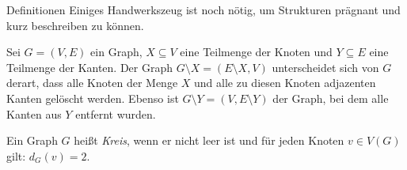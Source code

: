 \begin{chapter}{Definitionen}
  Einiges Handwerkszeug ist noch nötig, um Strukturen prägnant und kurz beschreiben zu können.
  
  \begin{definition}
   Sei $G=(V,E)$ ein Graph, $X \subseteq V$ eine Teilmenge der Knoten und $Y \subseteq E$ eine Teilmenge der Kanten. Der Graph $G\setminus X = (E\setminus X,V)$ unterscheidet sich von $G$ derart, dass alle Knoten der Menge $X$ und alle zu diesen Knoten adjazenten Kanten gelöscht werden. Ebenso ist $G\setminus Y = (V,E\setminus Y)$ der Graph, bei dem alle Kanten aus $Y$ entfernt wurden.
  \end{definition}
  
  \begin{definition}[Kreis]
   Ein Graph $G$ heißt \textit{Kreis}, wenn er nicht leer ist und für jeden Knoten $v\in V(G)$ gilt: $d_G(v) = 2$.
  \end{definition}



\end{chapter}